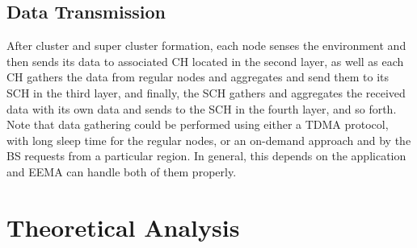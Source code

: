 \documentclass[journal]{IEEEtran}
\begin{document}
\subsection{Data Transmission}
\label{subsec:cl-fo}

After cluster and super cluster formation, each node senses the environment and then sends its data to associated CH located in the second layer, as well as each CH gathers the data from regular nodes and aggregates and send them to its SCH in the third layer, and finally, the SCH gathers and aggregates the received data with its own data and sends to the SCH in the fourth layer, and so forth. Note that data gathering could be performed using either a TDMA protocol, with long sleep time for the regular nodes, or an on-demand approach and by the BS requests from a particular region. In general, this depends on the application and EEMA can handle both of them properly.

\section{Theoretical Analysis}
\label{sec:theo-anal}
\end{document}
